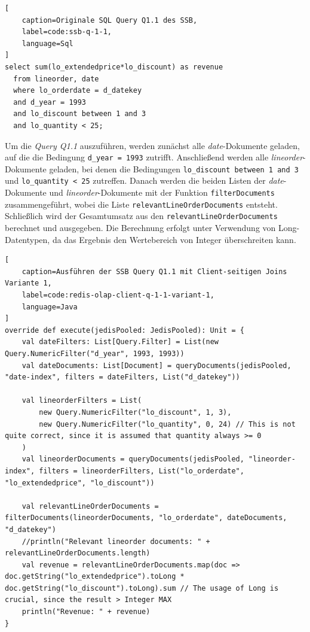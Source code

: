 \begin{lstlisting}[
    caption=Originale SQL Query Q1.1 des SSB,
    label=code:ssb-q-1-1,
    language=Sql
]
select sum(lo_extendedprice*lo_discount) as revenue
  from lineorder, date
  where lo_orderdate = d_datekey
  and d_year = 1993
  and lo_discount between 1 and 3
  and lo_quantity < 25;
\end{lstlisting}





Um die \emph{Query Q1.1} auszuführen, werden zunächst alle \emph{date}-Dokumente geladen, auf die die Bedingung \lstinline|d_year = 1993| zutrifft.
Anschließend werden alle \emph{lineorder}-Do\-ku\-men\-te geladen, bei denen die Bedingungen \lstinline|lo_discount between 1 and 3| und \lstinline|lo_quantity < 25| zutreffen.
Danach werden die beiden Listen der \emph{date}-Dokumente und \emph{lineorder}-Dokumente mit der Funktion \lstinline|filterDocuments| zusammengeführt, wobei die Liste \lstinline|relevantLineOrderDocuments| entsteht.
Schließlich wird der Ge\-samt\-um\-satz aus den \lstinline|relevantLineOrderDocuments| berechnet und ausgegeben. Die Berechnung erfolgt unter Verwendung von Long-Datentypen, da das Ergebnis den Wertebereich von Integer überschreiten kann.

\begin{lstlisting}[
    caption=Ausführen der SSB Query Q1.1 mit Client-seitigen Joins Variante 1,
    label=code:redis-olap-client-q-1-1-variant-1,
    language=Java
]
override def execute(jedisPooled: JedisPooled): Unit = {
	val dateFilters: List[Query.Filter] = List(new Query.NumericFilter("d_year", 1993, 1993))
	val dateDocuments: List[Document] = queryDocuments(jedisPooled, "date-index", filters = dateFilters, List("d_datekey"))

	val lineorderFilters = List(
		new Query.NumericFilter("lo_discount", 1, 3),
		new Query.NumericFilter("lo_quantity", 0, 24) // This is not quite correct, since it is assumed that quantity always >= 0
	)
	val lineorderDocuments = queryDocuments(jedisPooled, "lineorder-index", filters = lineorderFilters, List("lo_orderdate", "lo_extendedprice", "lo_discount"))

	val relevantLineOrderDocuments = filterDocuments(lineorderDocuments, "lo_orderdate", dateDocuments, "d_datekey")
	//println("Relevant lineorder documents: " + relevantLineOrderDocuments.length)
	val revenue = relevantLineOrderDocuments.map(doc => doc.getString("lo_extendedprice").toLong * doc.getString("lo_discount").toLong).sum // The usage of Long is crucial, since the result > Integer MAX
	println("Revenue: " + revenue)
}
\end{lstlisting}




